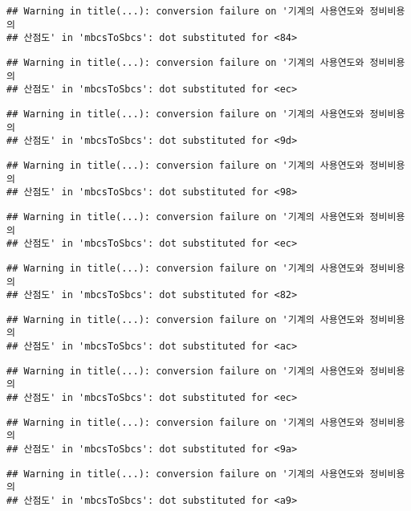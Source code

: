\documentclass[
]{article}
\begin{document}
\begin{verbatim}
## Warning in title(...): conversion failure on '기계의 사용연도와 정비비용의
## 산점도' in 'mbcsToSbcs': dot substituted for <84>
\end{verbatim}

\begin{verbatim}
## Warning in title(...): conversion failure on '기계의 사용연도와 정비비용의
## 산점도' in 'mbcsToSbcs': dot substituted for <ec>
\end{verbatim}

\begin{verbatim}
## Warning in title(...): conversion failure on '기계의 사용연도와 정비비용의
## 산점도' in 'mbcsToSbcs': dot substituted for <9d>
\end{verbatim}

\begin{verbatim}
## Warning in title(...): conversion failure on '기계의 사용연도와 정비비용의
## 산점도' in 'mbcsToSbcs': dot substituted for <98>
\end{verbatim}

\begin{verbatim}
## Warning in title(...): conversion failure on '기계의 사용연도와 정비비용의
## 산점도' in 'mbcsToSbcs': dot substituted for <ec>
\end{verbatim}

\begin{verbatim}
## Warning in title(...): conversion failure on '기계의 사용연도와 정비비용의
## 산점도' in 'mbcsToSbcs': dot substituted for <82>
\end{verbatim}

\begin{verbatim}
## Warning in title(...): conversion failure on '기계의 사용연도와 정비비용의
## 산점도' in 'mbcsToSbcs': dot substituted for <ac>
\end{verbatim}

\begin{verbatim}
## Warning in title(...): conversion failure on '기계의 사용연도와 정비비용의
## 산점도' in 'mbcsToSbcs': dot substituted for <ec>
\end{verbatim}

\begin{verbatim}
## Warning in title(...): conversion failure on '기계의 사용연도와 정비비용의
## 산점도' in 'mbcsToSbcs': dot substituted for <9a>
\end{verbatim}

\begin{verbatim}
## Warning in title(...): conversion failure on '기계의 사용연도와 정비비용의
## 산점도' in 'mbcsToSbcs': dot substituted for <a9>
\end{verbatim}
\end{document}
